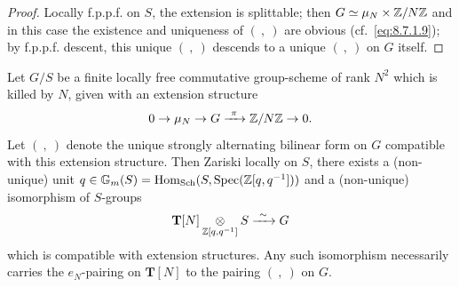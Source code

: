 \begin{proof}
Locally f.p.p.f. on $S$, the extension is splittable; then $G \simeq \mu_N \times \mathbb{Z}/N\mathbb{Z}$ and in this case the existence and uniqueness of $(\ ,\ )$ are obvious (cf.~\eqref{eq:8.7.1.9}); by f.p.p.f. descent, this unique $(\ ,\ )$ descends to a unique $(\ ,\ )$ on $G$ itself.
\end{proof}

\begin{kprop}\label{prop:8.10.5}
Let $G/S$ be a finite locally free commutative group-scheme of rank $N^2$ which is killed by $N$, given with an extension structure
\[
0 \to \mu_N \to G \xrightarrow{\ \pi\ } \mathbb{Z}/N\mathbb{Z} \to 0 .
\]
Let $(\ ,\ )$ denote the unique strongly alternating bilinear form on $G$ compatible with this extension structure. Then Zariski locally on $S$, there exists a (non-unique) unit $q \in \mathbb{G}_m(S) = \operatorname{Hom}_{\operatorname{Sch}}(S, \operatorname{Spec}(\mathbb{Z}[q,q^{-1}]))$ and a (non-unique) isomorphism of $S$-groups
\[
\mathbf{T}[N] \underset{\mathbb{Z}[q,q^{-1}]}{\otimes} S \xrightarrow{\ \sim\ } G
\]
which is compatible with extension structures. Any such isomorphism necessarily carries the $e_N$-pairing on $\mathbf{T}[N]$ to the pairing $(\ ,\ )$ on $G$.
\end{kprop}

